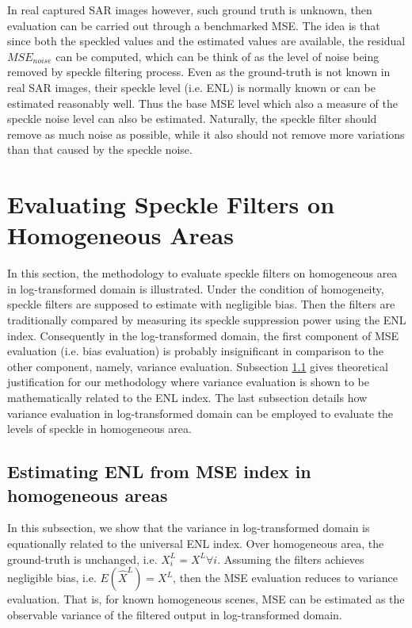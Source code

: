 \documentclass[journal]{IEEEtran}
\begin{document}
In real captured SAR images however, such ground truth is unknown, then evaluation can be carried out through a benchmarked MSE. 
The idea is that since both the speckled values and the estimated values are available, the residual $MSE_{noise}$ can be computed, which can be think of as the level of noise being removed by speckle filtering process.
Even as the ground-truth is not known in real SAR images, their speckle level (i.e. ENL) is normally known or can be estimated reasonably well.
Thus the base MSE level which also a measure of the speckle noise level can also be estimated.
Naturally, the speckle filter should remove as much noise as possible, 
	while it also should not remove more variations than that caused by the speckle noise.

\section{Evaluating Speckle Filters on Homogeneous Areas}
\label{sec:eval_homo}

In this section, the methodology to evaluate speckle filters on homogeneous area in log-transformed domain is illustrated.
Under the condition of homogeneity, speckle filters are supposed to estimate with negligible bias.
Then the filters are traditionally compared by measuring its speckle suppression power using the ENL index.
Consequently in the log-transformed domain, the first component of MSE evaluation (i.e. bias evaluation) is probably insignificant in comparison to the other component, namely, variance evaluation. 
Subsection \ref{sec:homogeneous_theoretical} gives theoretical justification for our methodology where variance evaluation is shown to be mathematically related to the ENL index.
The last subsection details how variance evaluation in log-transformed domain can be employed to evaluate the levels of speckle in homogeneous area.

\subsection{ Estimating ENL from MSE index in homogeneous areas }
\label{sec:homogeneous_theoretical}

In this subsection, we show that the variance in log-transformed domain is equationally related to the universal ENL index. 
Over homogeneous area, the ground-truth is unchanged, i.e. $X^L_i=X^L \forall i$.
Assuming the filters achieves negligible bias, i.e. $E(\hat{X}^L)=X^L$, 
	then the MSE evaluation reduces to variance evaluation.
That is, for known homogeneous scenes, MSE can be estimated as the observable variance of the filtered output in log-transformed domain.
\end{document}
